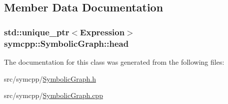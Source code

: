 \subsection{Member Data Documentation}
\subsubsection[{\texorpdfstring{head}{head}}]{\setlength{\rightskip}{0pt plus 5cm}std\+::unique\+\_\+ptr$<${\bf Expression}$>$ symcpp\+::\+Symbolic\+Graph\+::head\hspace{0.3cm}{\ttfamily [private]}}\hypertarget{classsymcpp_1_1SymbolicGraph_af7dd748252d7298792ff6329036de642}{}\label{classsymcpp_1_1SymbolicGraph_af7dd748252d7298792ff6329036de642}


The documentation for this class was generated from the following files\+:\begin{DoxyCompactItemize}
\item 
src/symcpp/\hyperlink{SymbolicGraph_8h}{Symbolic\+Graph.\+h}\item 
src/symcpp/\hyperlink{SymbolicGraph_8cpp}{Symbolic\+Graph.\+cpp}\end{DoxyCompactItemize}
